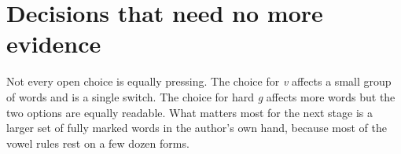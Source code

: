 \begin{table}[ht]\centering\small

\caption{Words that exercise the consonant decisions.}\label{tab:wcons}
\end{table}

\section{Decisions that need no more evidence}
Not every open choice is equally pressing. The choice for \emph{v} affects a small group of words and is a single switch. The choice for hard \emph{g} affects more words but the two options are equally readable. What matters most for the next stage is a larger set of fully marked words in the author's own hand, because most of the vowel rules rest on a few dozen forms.
